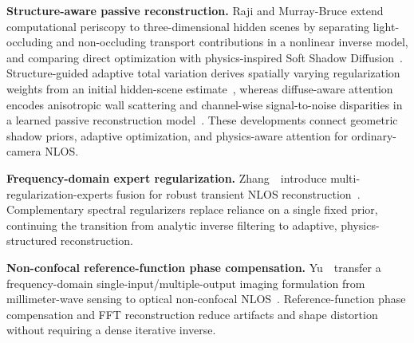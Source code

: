 
\vspace{0.8mm}
\noindent \textbf{Structure-aware passive reconstruction.}
Raji and Murray-Bruce extend computational periscopy to three-dimensional hidden scenes by separating light-occluding and non-occluding transport contributions in a nonlinear inverse model, and comparing direct optimization with physics-inspired Soft Shadow Diffusion~\cite{rajiSoftShadowDiffusion2026}. Structure-guided adaptive total variation derives spatially varying regularization weights from an initial hidden-scene estimate~\cite{zhangSGATVPassiveNLOS2026}, whereas diffuse-aware attention encodes anisotropic wall scattering and channel-wise signal-to-noise disparities in a learned passive reconstruction model~\cite{wangDAAMPassiveNLOS2026}. These developments connect geometric shadow priors, adaptive optimization, and physics-aware attention for ordinary-camera NLOS.

\vspace{0.8mm}
\noindent \textbf{Frequency-domain expert regularization.}
Zhang~\etal~introduce multi-regularization-experts fusion for robust transient NLOS reconstruction~\cite{zhangFMoENLOS2026}. Complementary spectral regularizers replace reliance on a single fixed prior, continuing the transition from analytic inverse filtering to adaptive, physics-structured reconstruction.

\vspace{0.8mm}
\noindent \textbf{Non-confocal reference-function phase compensation.}
Yu~\etal~transfer a frequency-domain single-input/multiple-output imaging formulation from millimeter-wave sensing to optical non-confocal NLOS~\cite{yuFrequencyDomainPhaseNLOS2026}. Reference-function phase compensation and FFT reconstruction reduce artifacts and shape distortion without requiring a dense iterative inverse.

